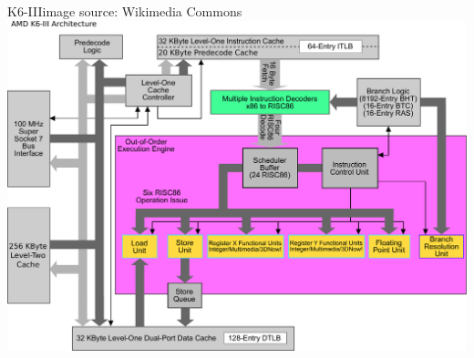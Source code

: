 \documentclass[mathserif,xcolor={dvipsnames,table}]{beamer}
\begin{document}
\begin{frame}{K6-III\hfill\tiny{image source: Wikimedia Commons}}
\includegraphics[width=\textwidth]{images/Amdk6III_arch.pdf}
\end{frame}
\end{document}

